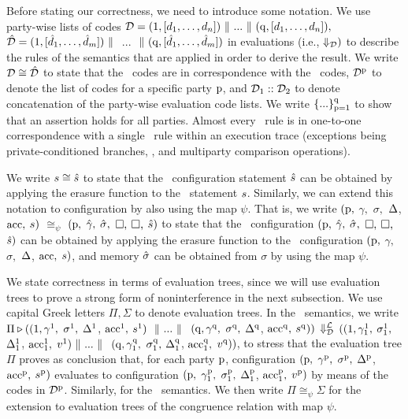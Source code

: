 Before stating our correctness, we need to introduce some notation.  We
use party-wise lists of codes $\mathcal{D} = (\mathrm{{1}}, [d_1,\ldots,d_n])\-\ \Vert\  ... \-\ \Vert\ (\mathrm{{q}}, [d_1,\ldots,d_n]),$ $\hat{\mathcal{D}} = (\mathrm{{1}}, [\hat{d}_1,\ldots,\hat{d}_m])\-\ \Vert\ $ $...$ $\-\ \Vert\ (\mathrm{{q}}, [\hat{d}_1,\ldots,\hat{d}_m])$ in evaluations (i.e.,
$\Downarrow_{\mathcal{D}})$ to describe the rules of the semantics that
are applied in order to derive the result.  We write
$\mathcal{D}\cong \hat{\mathcal{D}}$ to state that the \piccoC\
codes are in correspondence with the \vanillaC\
codes, $\mathcal{D}^{\mathrm{{p}}}$ to denote the list of codes for a specific party $\mathrm{{p}}$, and $\mathcal{D}_1::\mathcal{D}_2$ to denote concatenation of the party-wise evaluation code lists. 
We write $\{...\}^{\mathrm{{q}}}_{\mathrm{{p}} =1}$ to show that an assertion holds for all parties. 
Almost every \piccoC\ rule is in one-to-one
correspondence with a single \vanillaC\ rule within an execution trace (exceptions being private-conditioned branches, , and multiparty comparison operations).

 We write ${s}\cong \hat{s}$ to state that the \vanillaC\ configuration statement $\hat{s}$ can be obtained by applying the erasure function to the \piccoC\ statement ${s}$. Similarly, we can extend this notation to configuration by also using the map $\psi$. That is, we write
$(\mathrm{{p}},$ $\gamma{},$ $\sigma{},$ $\Delta$, $\mathrm{acc},$ ${s})$ $\cong_\psi$ $(\mathrm{{p}},$ $\hat{\gamma}{},$ $\hat{\sigma}{},$ $\Box,$ $\Box,$ $\hat{s})$ to state that the \vanillaC\ configuration  $(\mathrm{{p}},$ $\hat{\gamma}{},$ $\hat{\sigma}{},$ $\Box,$ $\Box,$ $\hat{s})$ can be obtained by applying the erasure function to the \piccoC\ configuration  $(\mathrm{{p}},$ $\gamma{},$ $\sigma{},$ $\Delta$, $\mathrm{acc},$ ${s})$, and memory $\hat{\sigma}$ can be obtained from $\sigma{}$ by using the map $\psi$.


We state correctness in terms of  evaluation trees, since we will use evaluation trees to prove a strong form of noninterference  in the next subsection. We use capital Greek letters $\Pi, \Sigma$ to denote evaluation trees.  In the \piccoC\ semantics, we write $\Pi \triangleright ((\mathrm{{1}}, \gamma^{{\mathrm{{1}}}}_{},$ $\sigma^{{\mathrm{{1}}}}_{},$ $\Delta^{{\mathrm{{1}}}}_{}$, $\mathrm{acc}^{{\mathrm{{1}}}}_{},$ $s^{{\mathrm{{1}}}})\ \-\ \Vert\  ...\-\ \Vert\ $ 
	$(\mathrm{{q}}, \gamma^{{\mathrm{{q}}}}_{},$ $\sigma^{{\mathrm{{q}}}}_{},$ $\Delta^{{\mathrm{{q}}}}_{}$, $\mathrm{acc}^{{\mathrm{{q}}}}_{},$ $s^{{\mathrm{{q}}}}))$ 
	$\Downarrow^{\mathcal{L}}_\mathit{\mathcal{D}}$ 
	$((\mathrm{{1}}, {\gamma^{{\mathrm{{1}}}}_{1}},$ ${\sigma^{{\mathrm{{1}}}}_{1}},$ $\Delta^{{\mathrm{{1}}}}_{1}$, $\mathrm{acc}^{{\mathrm{{1}}}}_{1},$ ${v^{{\mathrm{{1}}}}_{}}) \-\ \Vert\  ... \-\ \Vert\ $ 
	$(\mathrm{{q}}, {\gamma^{{\mathrm{{q}}}}_{1}},$ ${\sigma^{{\mathrm{{q}}}}_{1}},$ $\Delta^{{\mathrm{{q}}}}_{1}$, $\mathrm{acc}^{{\mathrm{{q}}}}_{1},$ $v^{{\mathrm{{q}}}}))$, to stress that the evaluation tree $\Pi$ proves as conclusion that, for each party $\mathrm{{p}}$, configuration  $(\mathrm{{p}},$ $\gamma^{\mathrm{{p}}},$ $\sigma^{\mathrm{{p}}},$ $\Delta^{\mathrm{{p}}}$, $\mathrm{acc}^{\mathrm{{p}}},$ $s^{\mathrm{{p}}})$ evaluates to configuration
$(\mathrm{{p}},$ $\gamma^{\mathrm{{p}}}_1,$ $\sigma^{\mathrm{{p}}}_1,$ $\Delta^{\mathrm{{p}}}_1$, $\mathrm{acc}^{\mathrm{{p}}}_1,$ $v^{\mathrm{{p}}})$ by means of the codes in $\mathcal{D}^{\mathrm{{p}}}$. Similarly, for the \vanillaC\ semantics. We then write $\Pi\cong_\psi \Sigma$ for the extension to evaluation trees of the congruence relation with map $\psi$.



